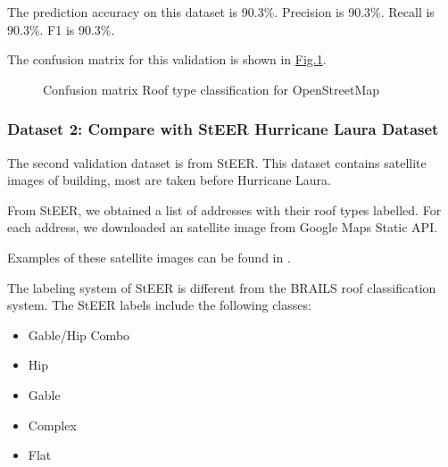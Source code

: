 \documentclass[letterpaper,10pt,english]{sphinxmanual}
\begin{document}
\sphinxAtStartPar
The prediction accuracy on this dataset is 90.3\%. Precision is 90.3\%. Recall is 90.3\%. F1 is 90.3\%.

\sphinxAtStartPar
The confusion matrix for this validation is shown in \hyperref[\detokenize{common/technical_manual/roof:fig-confusion-roof}]{Fig.\@ \ref{\detokenize{common/technical_manual/roof:fig-confusion-roof}}}.

\begin{figure}[htbp]
\centering
\capstart

\noindent{}
\caption{Confusion matrix \sphinxhyphen{} Roof type classification for OpenStreetMap}\label{\detokenize{common/technical_manual/roof:id4}}\label{\detokenize{common/technical_manual/roof:fig-confusion-roof}}\end{figure}


\subsubsection{Dataset 2: Compare with StEER Hurricane Laura Dataset}
\label{\detokenize{common/technical_manual/roof:dataset-2-compare-with-steer-hurricane-laura-dataset}}
\sphinxAtStartPar
The second validation dataset is from StEER.
This dataset contains satellite images of building, most are taken before Hurricane Laura.

\sphinxAtStartPar
From StEER, we obtained a list of addresses with their roof types labelled.
For each address, we downloaded an satellite image from Google Maps Static API.

\sphinxAtStartPar
Examples of these satellite images can be found in {\hyperref[\detokenize{common/technical_manual/roofTheory:rooftheory}]{}}.

\sphinxAtStartPar
The labeling system of StEER is different from the BRAILS roof classification system.
The StEER labels include the following classes:
\begin{itemize}
\item {} 
\sphinxAtStartPar
Gable/Hip Combo

\item {} 
\sphinxAtStartPar
Hip

\item {} 
\sphinxAtStartPar
Gable

\item {} 
\sphinxAtStartPar
Complex

\item {} 
\sphinxAtStartPar
Flat

\end{itemize}
\end{document}

